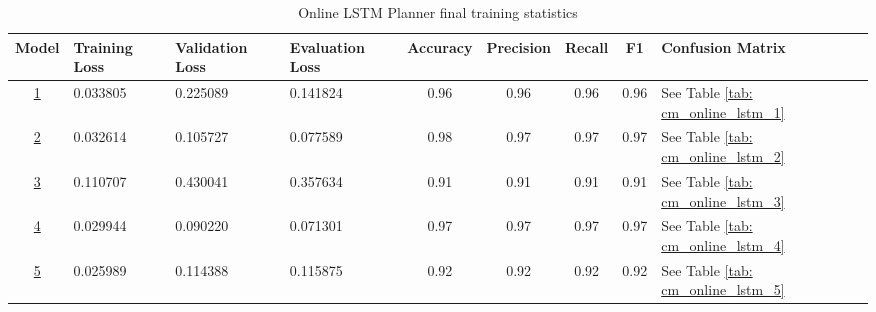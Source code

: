 \begin{table}[h!]
    \footnotesize
    \centerfloat
    \begin{tabular}{|c|M{1.5cm}|M{1.5cm}|M{1.5cm}|c|c|c|c|M{1.5cm}|}
         \hline
         \textbf{Model} & \textbf{Training Loss} & \textbf{Validation Loss} & \textbf{Evaluation Loss} & \textbf{Accuracy} & \textbf{Precision} & \textbf{Recall} & \textbf{F1} & \textbf{Confusion Matrix} \\
         \hline
          \hyperref[tab: evalalgorithms]{1} & 0.033805 & 0.225089 & 0.141824 & 0.96 & 0.96 & 0.96 & 0.96 & See Table \ref{tab: cm_online_lstm_1} \\
         \hline
          \hyperref[tab: evalalgorithms]{2} & 0.032614 & 0.105727 & 0.077589 & 0.98 & 0.97 & 0.97 & 0.97 & See Table \ref{tab: cm_online_lstm_2} \\
         \hline
          \hyperref[tab: evalalgorithms]{3} & 0.110707 & 0.430041 & 0.357634 & 0.91 & 0.91 & 0.91 & 0.91 & See Table \ref{tab: cm_online_lstm_3} \\
         \hline
          \hyperref[tab: evalalgorithms]{4} & 0.029944 & 0.090220 & 0.071301 & 0.97 & 0.97 & 0.97 & 0.97 & See Table \ref{tab: cm_online_lstm_4} \\
         \hline
          \hyperref[tab: evalalgorithms]{5} & 0.025989 & 0.114388 & 0.115875 & 0.92 & 0.92 & 0.92 & 0.92 & See Table \ref{tab: cm_online_lstm_5} \\
         \hline
    \end{tabular}
    \caption{Online LSTM Planner final training statistics}
    \label{tab: online_lstm_final_tr_res}
\end{table}

